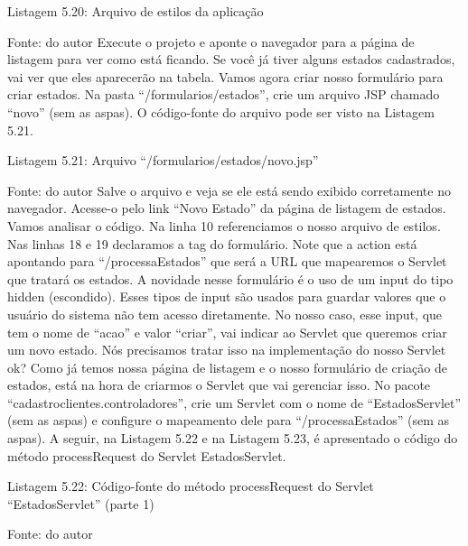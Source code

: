 Listagem 5.20: Arquivo de estilos da aplicação
 
Fonte: do autor
Execute o projeto e aponte o navegador para a página de listagem para ver como está ficando. Se você já tiver alguns estados cadastrados, vai ver que eles aparecerão na tabela. Vamos agora criar nosso formulário para criar estados. Na pasta ``/formularios/estados'', crie um arquivo JSP chamado ``novo'' (sem as aspas). O código-fonte do arquivo pode ser visto na Listagem 5.21.



Listagem 5.21: Arquivo ``/formularios/estados/novo.jsp''
 
Fonte: do autor
Salve o arquivo e veja se ele está sendo exibido corretamente no navegador. Acesse-o pelo link ``Novo Estado'' da página de listagem de estados. Vamos analisar o código. Na linha 10 referenciamos o nosso arquivo de estilos. Nas linhas 18 e 19 declaramos a tag do formulário. Note que a action está apontando para ``/processaEstados'' que será a URL que mapearemos o Servlet que tratará os estados. A novidade nesse formulário é o uso de um input do tipo hidden (escondido). Esses tipos de input são usados para guardar valores que o usuário do sistema não tem acesso diretamente. No nosso caso, esse input, que tem o nome de ``acao'' e valor ``criar'', vai indicar ao Servlet que queremos criar um novo estado. Nós precisamos tratar isso na implementação do nosso Servlet ok? Como já temos nossa página de listagem e o nosso formulário de criação de estados, está na hora de criarmos o Servlet que vai gerenciar isso. No pacote ``cadastroclientes.controladores'', crie um Servlet com o nome de ``EstadosServlet'' (sem as aspas) e configure o mapeamento dele para ``/processaEstados'' (sem as aspas).
A seguir, na Listagem 5.22 e na Listagem 5.23, é apresentado o código do método processRequest do Servlet EstadosServlet.




















Listagem 5.22: Código-fonte do método processRequest do Servlet ``EstadosServlet'' (parte 1)
 
Fonte: do autor





